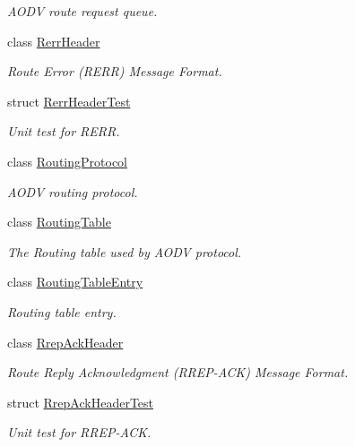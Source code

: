 \begin{DoxyCompactItemize}
\begin{DoxyCompactList}\small\item\em A\+O\+DV route request queue. \end{DoxyCompactList}\item 
class \hyperlink{classns3_1_1aodv_1_1RerrHeader}{Rerr\+Header}
\begin{DoxyCompactList}\small\item\em Route Error (R\+E\+RR) Message Format. \end{DoxyCompactList}\item 
struct \hyperlink{structns3_1_1aodv_1_1RerrHeaderTest}{Rerr\+Header\+Test}
\begin{DoxyCompactList}\small\item\em Unit test for R\+E\+RR. \end{DoxyCompactList}\item 
class \hyperlink{classns3_1_1aodv_1_1RoutingProtocol}{Routing\+Protocol}
\begin{DoxyCompactList}\small\item\em A\+O\+DV routing protocol. \end{DoxyCompactList}\item 
class \hyperlink{classns3_1_1aodv_1_1RoutingTable}{Routing\+Table}
\begin{DoxyCompactList}\small\item\em The Routing table used by A\+O\+DV protocol. \end{DoxyCompactList}\item 
class \hyperlink{classns3_1_1aodv_1_1RoutingTableEntry}{Routing\+Table\+Entry}
\begin{DoxyCompactList}\small\item\em Routing table entry. \end{DoxyCompactList}\item 
class \hyperlink{classns3_1_1aodv_1_1RrepAckHeader}{Rrep\+Ack\+Header}
\begin{DoxyCompactList}\small\item\em Route Reply Acknowledgment (R\+R\+E\+P-\/\+A\+CK) Message Format. \end{DoxyCompactList}\item 
struct \hyperlink{structns3_1_1aodv_1_1RrepAckHeaderTest}{Rrep\+Ack\+Header\+Test}
\begin{DoxyCompactList}\small\item\em Unit test for R\+R\+E\+P-\/\+A\+CK. \end{DoxyCompactList}\item 

\end{DoxyCompactItemize}
